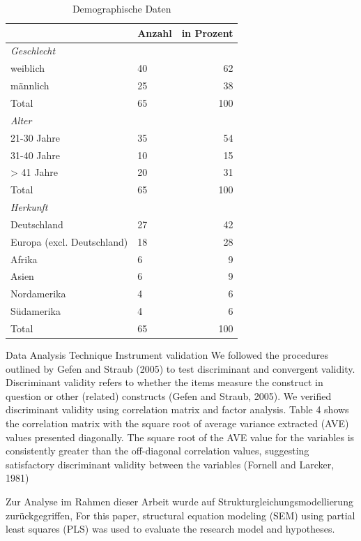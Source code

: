 \begin{table}[ht] 
\footnotesize
\caption{Demographische Daten}
\label{tab:Demographische Daten} 
\begin{tabular}{@{}lp{5cm}r@{}} \toprule

 & \textbf{Anzahl}&\textbf{in Prozent} \\ \midrule

\textit{Geschlecht}		& 				& \\ 
weiblich 				&  40 			& 62 \\
männlich				&  25			& 38 \\ 
Total					&  65			& 100 \\
\textit{Alter}			& 				&   \\
21-30 Jahre				&  35			& 54 \\
31-40 Jahre				&  10			& 15	  \\
> 41 Jahre				&  20 			& 31 \\
Total 					&  65			& 100 \\
\textit{Herkunft}		&				&   \\
Deutschland				& 27 			& 42  \\
Europa (excl. Deutschland) &18			& 28  \\
Afrika 					& 6				& 9   \\
Asien 					& 6				& 9   \\
Nordamerika				& 4				& 6   \\
Südamerika				& 4				& 6	 \\
Total					& 65				& 100  \\ 
  \bottomrule

\end{tabular}	
\end{table}


Data Analysis Technique
Instrument validation
We followed the procedures outlined by Gefen and Straub (2005) to test discriminant and convergent validity. Discriminant validity refers to whether the items measure the construct in question or other (related) constructs (Gefen and Straub, 2005). We verified discriminant validity using correlation matrix and factor analysis. Table 4 shows the correlation matrix with the square root of average variance extracted (AVE) values presented diagonally. The square root of the AVE value for the variables is consistently greater than the off-diagonal correlation values, suggesting satisfactory discriminant validity between the variables (Fornell and Larcker, 1981)

Zur Analyse im Rahmen dieser Arbeit wurde auf Strukturgleichungsmodellierung zurückgegriffen, 
For this paper, structural equation modeling (SEM) using partial least squares (PLS) was used to evaluate the research model and hypotheses.



